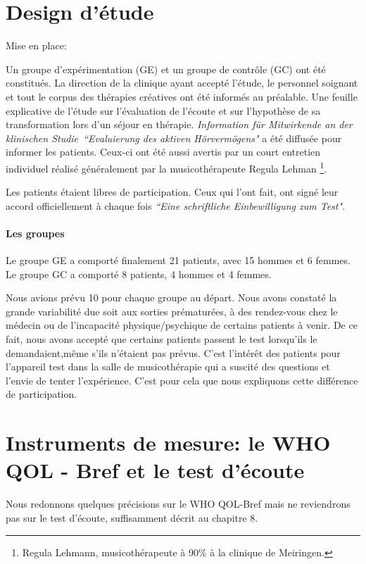 \section{Design d'étude}

Mise en place:

Un groupe d'expérimentation (GE) et un groupe de contrôle (GC) ont été constitués.
La direction de la clinique ayant accepté l'étude, le personnel soignant et tout le
corpus des thérapies créatives ont  été
informés au préalable.
Une feuille explicative de l'étude sur  l'évaluation de l'écoute et
sur
l'hypothèse de sa transformation lors d'un 
séjour en thérapie. \emph{Information für Mitwirkende an der klinischen
  Studie\  ``Evaluierung des aktiven Hörvermögens" } a été diffusée pour informer les patients.
Ceux-ci ont été aussi avertis par un
court entretien individuel réalisé généralement par la musicothérapeute Regula Lehman  \footnote{Regula
  Lehmann, musicothérapeute  à 90\%  à la clinique de Meiringen.}.

Les patients étaient libres de participation. Ceux qui
l'ont fait, ont signé leur accord  officiellement à chaque fois  \emph{``Eine schriftliche Einbewilligung zum
  Test"}.

\paragraph{Les groupes}

Le groupe GE a comporté finalement 21 patients, avec 15 hommes et 6
femmes.
Le groupe GC a comporté 8 patients, 4 hommes et 4 femmes.

Nous avions prévu 10 pour chaque groupe au départ. Nous avons
constaté la grande 
variabilité due soit aux sorties prématurées, à des rendez-vous chez le médecin
ou de l'incapacité physique/psychique de certains patients à venir. De
ce fait,
nous avons accepté que certains patients passent le test lorsqu'ils le
demandaient,même s'ils
n'étaient pas prévus. C'est l'intérêt des patients pour l'appareil
test dans la salle de musicothérapie qui a suscité des questions et
l'envie de tenter l'expérience. C'est pour cela que nous expliquons
cette différence de participation.

 
 
 

\section{Instruments de mesure: le WHO QOL - Bref et le test d'écoute}
 Nous redonnons quelques précisions sur le WHO QOL-Bref mais ne
 reviendrons pas sur le test d'écoute, suffisamment décrit au chapitre 8.

